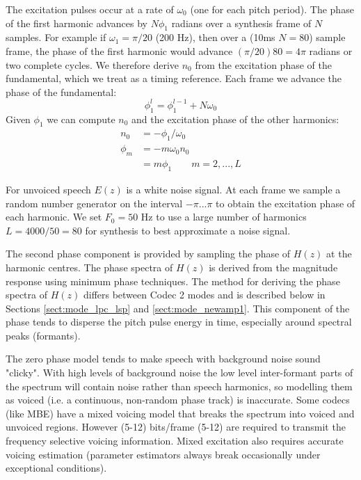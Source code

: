 \documentclass{article}
\begin{document}
The excitation pulses occur at a rate of $\omega_0$ (one for each pitch period). The phase of the first harmonic advances by $N \phi_1$ radians over a synthesis frame of $N$ samples.  For example if $\omega_1 = \pi /20$ (200 Hz), then over a (10ms $N=80$) sample frame, the phase of the first harmonic would advance $(\pi/20)80 = 4 \pi$ radians or two complete cycles. We therefore derive $n_0$ from the excitation phase of the fundamental, which we treat as a timing reference.  Each frame we advance the phase of the fundamental:
\begin{equation}
\phi_1^l = \phi_1^{l-1} + N\omega_0
\end{equation}
Given $\phi_1$ we can compute $n_0$ and the excitation phase of the other harmonics:
\begin{equation}
\begin{split}
n_0    &= -\phi_1 / \omega_0 \\
\phi_m &= - m \omega_0 n_0 \\
       &= m \phi_1 \quad \quad m=2,...,L
\end{split}
\end{equation}

For unvoiced speech $E(z)$ is a white noise signal.  At each frame we sample a random number generator on the interval $-\pi ... \pi$ to obtain the excitation phase of each harmonic.  We set $F_0 = 50$ Hz to use a large number of harmonics $L=4000/50=80$ for synthesis to best approximate a noise signal.

The second phase component is provided by sampling the phase of $H(z)$ at the harmonic centres.  The phase spectra of $H(z)$ is derived from the magnitude response using minimum phase techniques.  The method for deriving the phase spectra of $H(z)$ differs between Codec 2 modes and is described below in Sections \ref{sect:mode_lpc_lsp} and \ref{sect:mode_newamp1}.  This component of the phase tends to disperse the pitch pulse energy in time, especially around spectral peaks (formants).

The zero phase model tends to make speech with background noise sound "clicky".  With high levels of background noise the low level inter-formant parts of the spectrum will contain noise rather than speech harmonics, so modelling them as voiced (i.e. a continuous, non-random phase track) is inaccurate. Some codecs (like MBE) have a mixed voicing model that breaks the spectrum into voiced and unvoiced regions.  However (5-12) bits/frame (5-12) are required to transmit the frequency selective voicing information.  Mixed excitation also requires accurate voicing estimation (parameter estimators always break occasionally under exceptional conditions).
\end{document}
